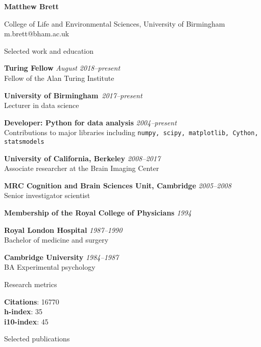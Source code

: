 \documentclass{cv}
\newcommand{\PlaceDate}[2]{{\bf #1} \hfill {\em #2} \\}
\newcommand{\PlaceDateNote}[3]{{\bf #1} \hfill {\em #2} \\#3}
\newcommand{\UCB}{University of California, Berkeley}
\newcommand{\UoB}{University of Birmingham\,}
\newcommand{\CBU}{MRC Cognition and Brain Sciences Unit, Cambridge}
\newcommand{\Pkg}[1]{{\tt #1}}
\begin{document}
{\huge \bf Matthew Brett}

College of Life and Environmental Sciences, University of Birmingham \\
m.brett@bham.ac.uk

\begin{cvSection}{Selected work and education}

\PlaceDateNote{Turing Fellow}{August 2018--present}
    {Fellow of the Alan Turing Institute}

\PlaceDateNote{\UoB}{2017--present }{
Lecturer in data science}

\PlaceDateNote{Developer: Python for data analysis}{2004--present}
{Contributions to major libraries including \Pkg{numpy, scipy, matplotlib,
    Cython, statsmodels}}

\PlaceDateNote{\UCB}{2008--2017 }{
Associate researcher at the Brain Imaging Center}

\PlaceDateNote{\CBU}{2005--2008}{
Senior investigator scientist}

{\bf Membership of the Royal College of Physicians} \hfill {\em 1994}

\PlaceDate{Royal London Hospital}{1987--1990 }
Bachelor of medicine and surgery

\PlaceDateNote{Cambridge University}{1984--1987 }{
BA Experimental psychology}

\end{cvSection}

\begin{cvSection}{Research metrics}

{\bf Citations}: 16770 \\
{\bf h-index}: 35 \\
{\bf i10-index}: 45

\end{cvSection}

\begin{cvSection}{Selected publications}

\nocite{virtanen2020scipy, millman2018rcsds, Poline2012, Brett2007,
    Nichols2005}

\printbibliography[heading=none]

\end{cvSection}
\end{document}
